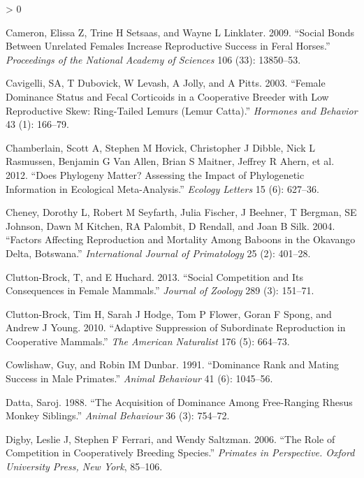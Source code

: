 \documentclass[
]{article}
\newlength{\cslhangindent}
\newenvironment{CSLReferences}[2] %
 {%
  \setlength{\parindent}{0pt}
  \ifodd #1 \everypar{\setlength{\hangindent}{\cslhangindent}}\ignorespaces\fi
  \ifnum #2 > 0
  \setlength{\parskip}{#2\baselineskip}
  \fi
 }%
 {}
\begin{document}
\begin{CSLReferences}{1}{0}
\leavevmode\hypertarget{ref-cameron2009social}{}%
Cameron, Elissa Z, Trine H Setsaas, and Wayne L Linklater. 2009.
{``Social Bonds Between Unrelated Females Increase Reproductive Success
in Feral Horses.''} \emph{Proceedings of the National Academy of
Sciences} 106 (33): 13850--53.

\leavevmode\hypertarget{ref-cavigelli2003female}{}%
Cavigelli, SA, T Dubovick, W Levash, A Jolly, and A Pitts. 2003.
{``Female Dominance Status and Fecal Corticoids in a Cooperative Breeder
with Low Reproductive Skew: Ring-Tailed Lemurs (Lemur Catta).''}
\emph{Hormones and Behavior} 43 (1): 166--79.

\leavevmode\hypertarget{ref-chamberlain2012does}{}%
Chamberlain, Scott A, Stephen M Hovick, Christopher J Dibble, Nick L
Rasmussen, Benjamin G Van Allen, Brian S Maitner, Jeffrey R Ahern, et
al. 2012. {``Does Phylogeny Matter? Assessing the Impact of Phylogenetic
Information in Ecological Meta-Analysis.''} \emph{Ecology Letters} 15
(6): 627--36.

\leavevmode\hypertarget{ref-cheney2004factors}{}%
Cheney, Dorothy L, Robert M Seyfarth, Julia Fischer, J Beehner, T
Bergman, SE Johnson, Dawn M Kitchen, RA Palombit, D Rendall, and Joan B
Silk. 2004. {``Factors Affecting Reproduction and Mortality Among
Baboons in the Okavango Delta, Botswana.''} \emph{International Journal
of Primatology} 25 (2): 401--28.

\leavevmode\hypertarget{ref-clutton2013social}{}%
Clutton-Brock, T, and E Huchard. 2013. {``Social Competition and Its
Consequences in Female Mammals.''} \emph{Journal of Zoology} 289 (3):
151--71.

\leavevmode\hypertarget{ref-clutton2010adaptive}{}%
Clutton-Brock, Tim H, Sarah J Hodge, Tom P Flower, Goran F Spong, and
Andrew J Young. 2010. {``Adaptive Suppression of Subordinate
Reproduction in Cooperative Mammals.''} \emph{The American Naturalist}
176 (5): 664--73.

\leavevmode\hypertarget{ref-cowlishaw1991dominance}{}%
Cowlishaw, Guy, and Robin IM Dunbar. 1991. {``Dominance Rank and Mating
Success in Male Primates.''} \emph{Animal Behaviour} 41 (6): 1045--56.

\leavevmode\hypertarget{ref-datta1988acquisition}{}%
Datta, Saroj. 1988. {``The Acquisition of Dominance Among Free-Ranging
Rhesus Monkey Siblings.''} \emph{Animal Behaviour} 36 (3): 754--72.

\leavevmode\hypertarget{ref-digby2006role}{}%
Digby, Leslie J, Stephen F Ferrari, and Wendy Saltzman. 2006. {``The
Role of Competition in Cooperatively Breeding Species.''} \emph{Primates
in Perspective. Oxford University Press, New York}, 85--106.


\end{CSLReferences}
\end{document}
